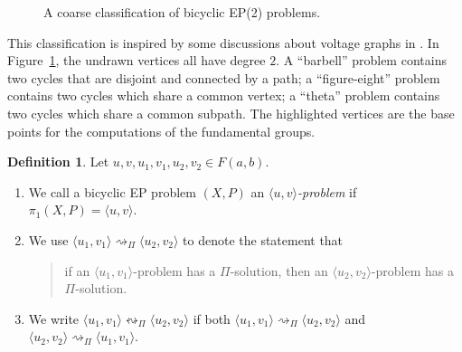\documentclass[10pt,a4paper]{amsart}
\theoremstyle{definition}
\newtheorem{definition}[theorem]{Definition}
\theoremstyle{definition}
\numberwithin{equation}{section}
\begin{document}
\begin{figure}[htbp]
\centering
\caption{\label{fig:BEP2} A coarse classification of bicyclic EP(2) problems.}
\end{figure}
This classification is inspired by some discussions about voltage graphs in \cite{GTBook}. In Figure~\ref{fig:BEP2}, the undrawn vertices all have degree $2$. A ``barbell'' problem contains two cycles that are disjoint and connected by a path; a ``figure-eight'' problem contains two cycles which share a common vertex; a ``theta'' problem contains two cycles which share a common subpath. The highlighted vertices are the base points for the computations of the fundamental groups. 

\begin{definition} Let $u, v, u_1, v_1, u_2, v_2\in F(a, b)$. 
\begin{enumerate}
\item[(1)] We call a bicyclic EP problem $(X, P)$ an {\em $\langle u, v\rangle$-problem} if $\pi_1(X, P)=\langle u, v\rangle$.
\item[(2)] We use $\langle u_1, v_1\rangle\rightsquigarrow_{\Pi}\langle u_2, v_2\rangle$ to denote the statement that 
\begin{quote}
if an $\langle u_1, v_1\rangle$-problem has a $\Pi$-solution, then an $\langle u_2, v_2\rangle$-problem has a $\Pi$-solution.
\end{quote}
\item[(3)] We write $\langle u_1, v_1\rangle\leftrightsquigarrow_{\Pi} \langle u_2, v_2\rangle$ if both $\langle u_1, v_1\rangle\rightsquigarrow_{\Pi} \langle u_2, v_2\rangle$ and $\langle u_2, v_2\rangle\rightsquigarrow_{\Pi} \langle u_1, v_1\rangle$.
\end{enumerate}
\end{definition}
\end{document}

